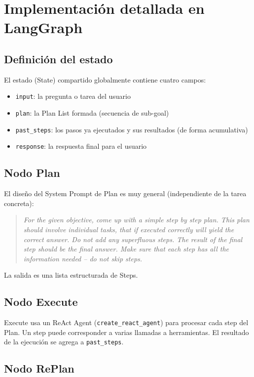 \section{Implementación detallada en LangGraph}

\subsection{Definición del estado}

El estado (State) compartido globalmente contiene cuatro campos:
\begin{itemize}
    \item \texttt{input}: la pregunta o tarea del usuario
    \item \texttt{plan}: la Plan List formada (secuencia de sub-goal)
    \item \texttt{past\_steps}: los pasos ya ejecutados y sus resultados (de forma acumulativa)
    \item \texttt{response}: la respuesta final para el usuario
\end{itemize}

\subsection{Nodo Plan}

El diseño del System Prompt de Plan es muy general (independiente de la tarea concreta):
\begin{quote}
\textit{For the given objective, come up with a simple step by step plan. This plan should involve individual tasks, that if executed correctly will yield the correct answer. Do not add any superfluous steps. The result of the final step should be the final answer. Make sure that each step has all the information needed -- do not skip steps.}
\end{quote}

La salida es una lista estructurada de Steps.

\subsection{Nodo Execute}

Execute usa un ReAct Agent (\texttt{create\_react\_agent}) para procesar cada step del Plan. Un step puede corresponder a varias llamadas a herramientas. El resultado de la ejecución se agrega a \texttt{past\_steps}.

\subsection{Nodo RePlan}

